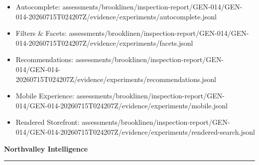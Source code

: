 \documentclass[10pt]{article}
\newcommand{\ReportFine}[1]{{\fontsize{7.6}{9.1}\selectfont\color{NVIMuted}#1}}
\begin{document}
\begin{itemize}
\item \ReportFine{Autocomplete: assessments/brooklinen/inspection-report/GEN-014/GEN-014-20260715T024207Z/evidence/experiments/autocomplete.jsonl}
\item \ReportFine{Filters \& Facets: assessments/brooklinen/inspection-report/GEN-014/GEN-014-20260715T024207Z/evidence/experiments/facets.jsonl}
\item \ReportFine{Recommendations: assessments/brooklinen/inspection-report/GEN-014/GEN-014-20260715T024207Z/evidence/experiments/recommendations.jsonl}
\item \ReportFine{Mobile Experience: assessments/brooklinen/inspection-report/GEN-014/GEN-014-20260715T024207Z/evidence/experiments/mobile.jsonl}
\item \ReportFine{Rendered Storefront: assessments/brooklinen/inspection-report/GEN-014/GEN-014-20260715T024207Z/evidence/experiments/rendered-search.jsonl}
\end{itemize}
\vfill
\begin{center}
{\fontsize{16}{19}\selectfont\bfseries\color{NVIInk}Northvalley Intelligence}\\[0.06in]
{\color{NVIAccent}\rule{2.2in}{0.8pt}}\\[0.08in]
\ReportFine{\NorthvalleyContactLine}
\end{center}
\end{document}
